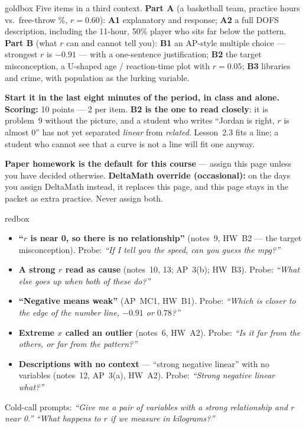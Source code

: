\documentclass[10pt]{article}
\begin{document}
\boxguard
\begin{skillbox}{goldbox}
Five items in a third context. \textbf{Part A} (a basketball team, practice hours vs.\
free-throw \%, $r = 0.60$): \textbf{A1} explanatory and response; \textbf{A2} a full DOFS
description, including the 11-hour, 50\% player who sits far below the pattern. \textbf{Part B}
(what $r$ can and cannot tell you): \textbf{B1} an AP-style multiple choice --- strongest $r$
is $-0.91$ --- with a one-sentence justification; \textbf{B2} the target misconception, a
U-shaped age / reaction-time plot with $r = 0.05$; \textbf{B3} libraries and crime, with
population as the lurking variable.

\textbf{Start it in the last eight minutes of the period, in class and alone.}
\textbf{Scoring:} 10 points --- 2 per item. \textbf{B2 is the one to read closely}: it is
problem~9 without the picture, and a student who writes ``Jordan is right, $r$ is almost 0''
has not yet separated \emph{linear} from \emph{related}. Lesson~2.3 fits a line; a student who
cannot see that a curve is not a line will fit one anyway.

\textbf{Paper homework is the default for this course} --- assign this page unless you have
decided otherwise. \textbf{DeltaMath override (occasional):} on the days you assign DeltaMath
instead, it replaces this page, and this page
stays in the packet as extra practice. Never assign both.
\end{skillbox}

\boxguard
\begin{skillbox}{redbox}
\begin{itemize}[leftmargin=1.2em, nosep]
  \item \textbf{``$r$ is near 0, so there is no relationship''} (notes~9, HW~B2 --- the target
        misconception). Probe: \emph{``If I tell you the speed, can you guess the mpg?''}
  \item \textbf{A strong $r$ read as cause} (notes~10, 13; AP~3(b); HW~B3). Probe:
        \emph{``What else goes up when both of these do?''}
  \item \textbf{``Negative means weak''} (AP~MC1, HW~B1). Probe: \emph{``Which is closer to
        the edge of the number line, $-0.91$ or $0.78$?''}
  \item \textbf{Extreme $x$ called an outlier} (notes~6, HW~A2). Probe: \emph{``Is it far from
        the others, or far from the pattern?''}
  \item \textbf{Descriptions with no context} --- ``strong negative linear'' with no variables
        (notes~12, AP~3(a), HW~A2). Probe: \emph{``Strong negative linear \emph{what}?''}
\end{itemize}
Cold-call prompts: \emph{``Give me a pair of variables with a strong relationship and $r$ near
0.''} \quad \emph{``What happens to $r$ if we measure in kilograms?''}
\end{skillbox}
\end{document}
